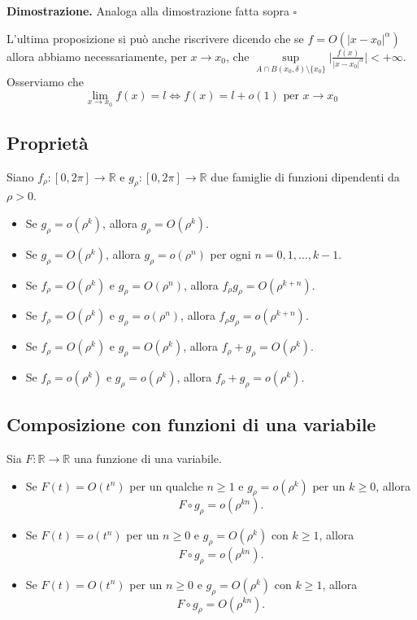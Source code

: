 \noindent \textbf{Dimostrazione. }
Analoga alla dimostrazione fatta sopra
\hfill $\square$

\noindent L'ultima proposizione si può anche riscrivere dicendo che se $f=O(|x-x_0|^\alpha)$ allora abbiamo necessariamente, per $x \to x_0$, che $\sup\limits_{A \cap B(x_0, \delta) \setminus \{ x_0 \}} \Bigg| \frac{f(x)}{|x-x_0|^{\alpha}} \Bigg| < +\infty$. \\
Osserviamo che
$$
\lim_{x \to x_0} f(x) = l \iff f(x) = l + o(1) \text{ per } x \to x_0
$$

\subsection{Proprietà}

Siano \( f_{\rho}: [0, 2\pi] \to \mathbb{R} \) e \( g_{\rho}: [0, 2\pi] \to \mathbb{R} \) due famiglie di funzioni dipendenti da \(\rho > 0\).

\begin{itemize}
	\item Se \( g_{\rho} = o(\rho^k) \), allora \( g_{\rho} = O(\rho^k) \).
	\item Se \( g_{\rho} = O(\rho^k) \), allora \( g_{\rho} = o(\rho^n) \) per ogni \( n = 0, 1, \ldots, k-1 \).
	\item Se \( f_{\rho} = O(\rho^k) \) e \( g_{\rho} = O(\rho^n) \), allora \( f_{\rho} g_{\rho} = O(\rho^{k+n}) \).
	\item Se \( f_{\rho} = O(\rho^k) \) e \( g_{\rho} = o(\rho^n) \), allora \( f_{\rho} g_{\rho} = o(\rho^{k+n}) \).
	\item Se \( f_{\rho} = O(\rho^k) \) e \( g_{\rho} = O(\rho^k) \), allora \( f_{\rho} + g_{\rho} = O(\rho^k) \).
	\item Se \( f_{\rho} = o(\rho^k) \) e \( g_{\rho} = o(\rho^k) \), allora \( f_{\rho} + g_{\rho} = o(\rho^k) \).
\end{itemize}

\subsection{Composizione con funzioni di una variabile}

Sia \( F: \mathbb{R} \to \mathbb{R} \) una funzione di una variabile.

\begin{itemize}
	\item Se \( F(t) = O(t^n) \) per un qualche \( n \geq 1 \) e \( g_{\rho} = o(\rho^k) \) per un \( k \geq 0 \), allora
	\[
	F \circ g_{\rho} = o(\rho^{kn}).
	\]
	\item Se \( F(t) = o(t^n) \) per un \( n \geq 0 \) e \( g_{\rho} = O(\rho^k) \) con \( k \geq 1 \), allora
	\[
	F \circ g_{\rho} = o(\rho^{kn}).
	\]
	\item Se \( F(t) = O(t^n) \) per un \( n \geq 0 \) e \( g_{\rho} = O(\rho^k) \) con \( k \geq 1 \), allora
	\[
	F \circ g_{\rho} = O(\rho^{kn}).
	\]
\end{itemize}

